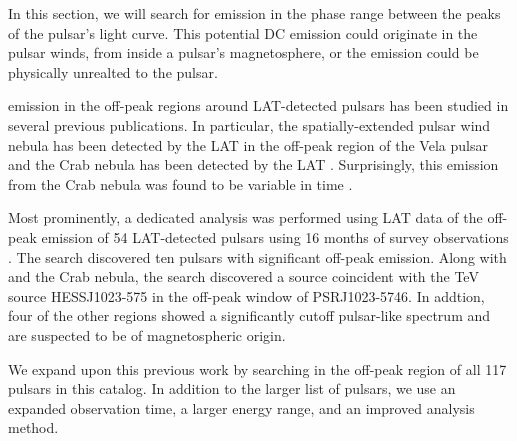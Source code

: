 
In this section, we will search for emission in the phase range between
the peaks of the pulsar's light curve. This potential DC emission could originate
in the pulsar winds, from inside a pulsar's magnetosphere, or 
the emission could be physically unrealted to the pulsar.

\gev emission in the off-peak regions around LAT-detected
pulsars has been studied in several previous publications. In
particular, the spatially-extended \velax pulsar wind nebula has
been detected by the LAT in the off-peak region of the Vela pulsar
\citep{LAT_collaboration_Vela_X_2010} and the Crab nebula has been
detected by the LAT \citep{LAT_collaboration_crab_2010}.  Surprisingly,
this \gev emission from the Crab nebula was found to be variable in
time \citep{LAT_Collaboration_Crab_Flare_2011}.

Most prominently, a dedicated analysis was performed using LAT data of
the off-peak emission of 54 LAT-detected pulsars using 16 months of survey
observations \citep{LAT_collaboration_PWNCAT_2011}.  The search discovered
ten pulsars with significant off-peak emission.  Along with \velax and the
Crab nebula, the search discovered a source coincident with the TeV source
HESS\;J1023-575 in the off-peak window of PSR\;J1023-5746. In addtion,
four of the other regions showed a significantly cutoff pulsar-like
spectrum and are suspected to be of magnetospheric origin.

We expand upon this previous work by searching in the off-peak region
of all 117 pulsars in this catalog. In addition to the larger list of
pulsars, we use an expanded observation time, a larger energy range,
and an improved analysis method.
